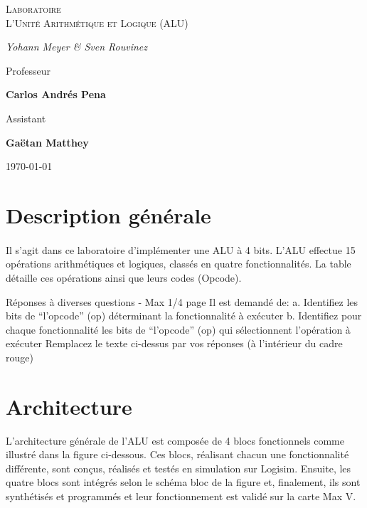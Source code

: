 \documentclass[a4paper]{article}
\begin{document}
\begin{titlepage}
	\centering
	
	{\scshape\LARGE \color{Monokaimagenta} Laboratoire \\ L'Unité Arithmétique et Logique (ALU) \par}
	\vspace{1cm}
	
	{\Large\itshape Yohann Meyer \& Sven Rouvinez\par}
	\vfill
	Professeur\par
	\textbf{Carlos Andrés Pena}\par
	\vspace{1cm}
	Assistant\par
	\textbf{Gaëtan Matthey}
	
	\vfill

	{\large \today\par}
\end{titlepage}



\section{Description générale}
\paragraph{}
Il s’agit dans ce laboratoire d’implémenter une ALU à 4 bits. L’ALU effectue 15 opérations arithmétiques et logiques, classés en quatre fonctionnalités. La table détaille ces opérations ainsi que leurs codes (Opcode).

	
\begin{tcolorbox}[colframe=Monokaimagenta,colback=white]
Réponses à diverses questions - Max 1/4 page 
Il est demandé de: 
a. Identifiez les bits de “l’opcode” (op) déterminant la fonctionnalité à exécuter
b. Identifiez pour chaque fonctionnalité les bits de “l’opcode” (op) qui sélectionnent l’opération à exécuter
Remplacez le texte ci-dessus par vos réponses (à l’intérieur du cadre rouge)\\
\begin{center}
    


\end{center}

\end{tcolorbox}

\section{Architecture}
L’architecture générale de l’ALU est composée de 4 blocs fonctionnels comme illustré dans la figure ci-dessous. Ces blocs, réalisant chacun une fonctionnalité différente, sont conçus, réalisés et testés en simulation sur Logisim. Ensuite, les quatre blocs sont intégrés selon le schéma bloc de la figure et, finalement, ils sont synthétisés et programmés et leur fonctionnement est validé sur la carte Max V. 
\end{document}
